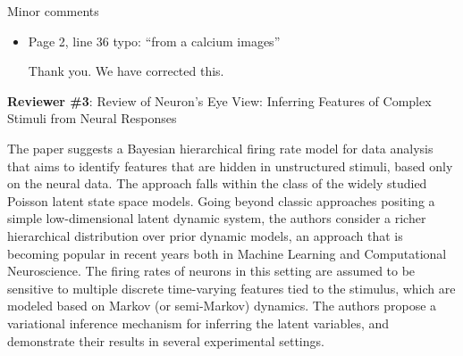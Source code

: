 \documentclass[12pt,a4paper]{article}
\newcommand{\edit}[1]{\textcolor{edit}{#1}}
\begin{document}
Minor comments
\begin{itemize}
    \item Page 2, line 36 typo: “from a calcium images”

    \edit{Thank you. We have corrected this.}
\end{itemize}

{\bf Reviewer \#3}: Review of Neuron's Eye View: Inferring Features of Complex Stimuli from Neural Responses

The paper suggests a Bayesian hierarchical firing rate model for data analysis that aims to identify features that are hidden in unstructured stimuli, based only on the neural data. The approach falls within the class of the widely studied Poisson latent state space models. Going beyond classic approaches positing a simple low-dimensional latent dynamic system, the authors consider a richer hierarchical distribution over prior dynamic models, an approach that is becoming popular in recent years both in Machine Learning and Computational Neuroscience. The firing rates of neurons in this setting are assumed to be sensitive to multiple discrete time-varying features tied to the stimulus, which are modeled based on Markov (or semi-Markov) dynamics. The authors propose a variational inference mechanism for inferring the latent variables, and demonstrate their results in several experimental settings.
\end{document}
